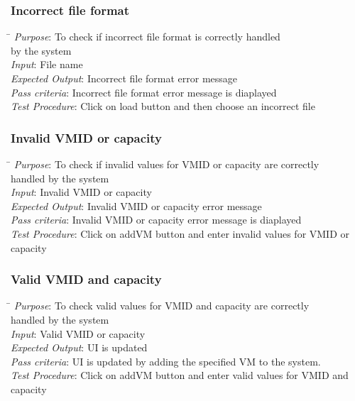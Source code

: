 \documentclass[a4paper,10pt]{article}
\begin{document}
\subsubsection{Incorrect file format}
\begin{tabbing}
 \hspace*{4cm}\= \kill
 \emph{Purpose}\>: To check if incorrect file format is correctly handled\\ \> by the system \\
 \emph{Input}\>: File name\\
 \emph{Expected Output}\>: Incorrect file format error message\\
 \emph{Pass criteria}\>: Incorrect file format error message is diaplayed\\
 \emph{Test Procedure}\>: Click on load button and then choose an incorrect file\\
\end{tabbing}
\subsubsection{Invalid VM\textunderscore ID or capacity}
\begin{tabbing}
 \hspace*{4cm}\= \kill
 \emph{Purpose}\>: To check if invalid values for VM\textunderscore ID or capacity are correctly\\ \> handled by the system \\
 \emph{Input}\>: Invalid VM\textunderscore ID or capacity\\
 \emph{Expected Output}\>: Invalid VM\textunderscore ID or capacity error message\\
 \emph{Pass criteria}\>: Invalid VM\textunderscore ID or capacity error message is diaplayed\\
 \emph{Test Procedure}\>: Click on addVM button and enter invalid values for VM\textunderscore ID or capacity\\
\end{tabbing}
\subsubsection{Valid VM\textunderscore ID and capacity}
\begin{tabbing}
 \hspace*{4cm}\= \kill
 \emph{Purpose}\>: To check valid values for VM\textunderscore ID and capacity are correctly \\ \>handled by the system \\
 \emph{Input}\>: Valid VM\textunderscore ID or capacity\\
 \emph{Expected Output}\>: UI is updated\\
 \emph{Pass criteria}\>: UI is updated by adding the specified VM to the system.\\
 \emph{Test Procedure}\>: Click on addVM button and enter valid values for VM\textunderscore ID and capacity\\
\end{tabbing}
\end{document}
